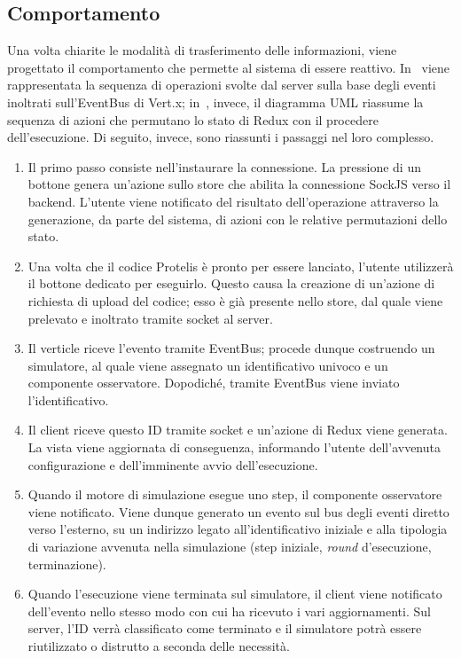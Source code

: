     \subsection{Comportamento}

      Una volta chiarite le modalità di trasferimento delle informazioni, viene progettato il comportamento che permette al sistema di essere reattivo.
      In~ viene rappresentata la sequenza di operazioni svolte dal server sulla base degli eventi inoltrati sull'EventBus di Vert.x;
      in~, invece, il diagramma UML riassume la sequenza di azioni che permutano lo stato di Redux con il procedere dell'esecuzione.
      Di seguito, invece, sono riassunti i passaggi nel loro complesso.

      \begin{enumerate}
        \item
          Il primo passo consiste nell'instaurare la connessione.
          La pressione di un bottone genera un'azione sullo store che abilita la connessione SockJS verso il backend.
          L'utente viene notificato del risultato dell'operazione attraverso la generazione, da parte del sistema, di azioni con le relative permutazioni dello stato.
        \item
          Una volta che il codice Protelis è pronto per essere lanciato, l'utente utilizzerà il bottone dedicato per eseguirlo.
          Questo causa la creazione di un'azione di richiesta di upload del codice;
          esso è già presente nello store, dal quale viene prelevato e inoltrato tramite socket al server.
        \item
          Il verticle riceve l'evento tramite EventBus;
          procede dunque costruendo un simulatore, al quale viene assegnato un identificativo univoco e un componente osservatore.
          Dopodiché, tramite EventBus viene inviato l'identificativo.
        \item
          Il client riceve questo ID tramite socket e un'azione di Redux viene generata.
          La vista viene aggiornata di conseguenza, informando l'utente dell'avvenuta configurazione e dell'imminente avvio dell'esecuzione.
        \item
          Quando il motore di simulazione esegue uno step, il componente osservatore viene notificato.
          Viene dunque generato un evento sul bus degli eventi diretto verso l'esterno, su un indirizzo legato all'identificativo iniziale e alla tipologia di variazione avvenuta nella simulazione (step iniziale, \emph{round} d'esecuzione, terminazione).
        \item
          Quando l'esecuzione viene terminata sul simulatore, il client viene notificato dell'evento nello stesso modo con cui ha ricevuto i vari aggiornamenti.
          Sul server, l'ID verrà classificato come terminato e il simulatore potrà essere riutilizzato o distrutto a seconda delle necessità.
      \end{enumerate}

